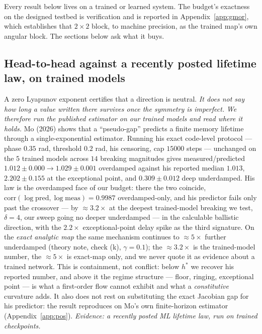 \documentclass{article}
\begin{document}
Every result below lives on a trained or learned system. The budget's exactness on the designed testbed is verification and is reported in Appendix~\ref{app:gmor}, which establishes that $2\times2$ block, to machine precision, as the trained map's own angular block. The sections below ask what it buys.

\subsection{Head-to-head against a recently posted lifetime law, on trained models}\label{sec:mo}

A zero Lyapunov exponent certifies that a direction is neutral. \emph{It does not say how long a value written there survives once the symmetry is imperfect.} \emph{We therefore run the published estimator on our trained models and read where it holds.} Mo (2026) shows that a ``pseudo-gap'' predicts a finite memory lifetime through a single-exponential estimator. Running his exact code-level protocol --- phase $0.35$ rad, threshold $0.2$ rad, his censoring, cap $15000$ steps --- unchanged on the $5$ trained models across $14$ breaking magnitudes gives measured/predicted $1.012\pm0.000\to1.029\pm0.001$ overdamped against his reported median $1.013$, $2.202\pm0.155$ at the exceptional point, and $0.309\pm0.012$ deep underdamped. His law is the overdamped face of our budget: there the two coincide, $\mathrm{corr}(\log\mathrm{pred},\log\mathrm{meas})=0.9987$ overdamped-only, and his predictor fails only past the crossover --- by $\approx3.2\times$ at the deepest trained-model breaking we test, $\delta=4$, our sweep going no deeper underdamped --- in the calculable ballistic direction, with the $2.2\times$ exceptional-point delay spike as the third signature. On the \emph{exact analytic map} the same mechanism continues to $\approx5\times$ further underdamped (theory note, check (k), $\gamma=0.1$); the $\approx3.2\times$ is the trained-model number, the $\approx5\times$ is exact-map only, and we never quote it as evidence about a trained network. This is containment, not conflict: below $h^*$ we recover his reported number, and above it the regime structure --- floor, ringing, exceptional point --- is what a first-order flow cannot exhibit and what a \emph{constitutive} curvature adds. It also does not rest on substituting the exact Jacobian gap for his predictor: the result reproduces on Mo's own finite-horizon estimator (Appendix~\ref{app:pos}). \emph{Evidence: a recently posted ML lifetime law, run on trained checkpoints.}
\end{document}
